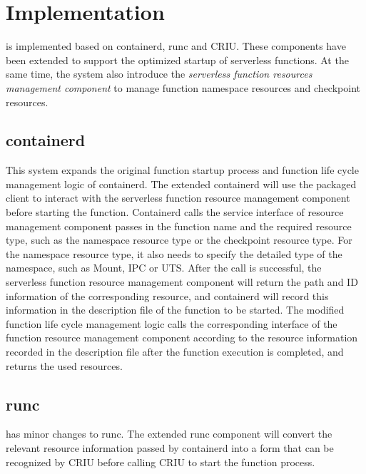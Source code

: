 \section{Implementation}

\pname is implemented based on containerd, runc and CRIU. 
These components have been extended to support the optimized startup of serverless functions. 
At the same time, the system also introduce the \textit{serverless function resources management component} to manage function namespace resources and checkpoint resources.

\subsection{containerd}
This system expands the original function startup process and function life cycle management logic of containerd. 
The extended containerd will use the packaged client to interact with the serverless 
function resource management component before starting the function. 
Containerd calls the service interface of resource management component passes 
in the function name and the required resource type, 
such as the namespace resource type or the checkpoint resource type. For the namespace resource type, 
it also needs to specify the detailed type of the namespace, 
such as Mount, IPC or UTS. 
After the call is successful, 
the serverless function resource management component 
will return the path and ID information of 
the corresponding resource, 
and containerd will record this information 
in the description file of the function to be started. 
The modified function life cycle management logic calls the corresponding interface of the function resource management 
component according to the resource information recorded in 
the description file after the function execution is completed, 
and returns the used resources.

\subsection{runc}

\pname has minor changes to runc. 
The extended runc component will convert the relevant resource information passed by 
containerd into a form that can be recognized by CRIU before calling CRIU to start the function process.

